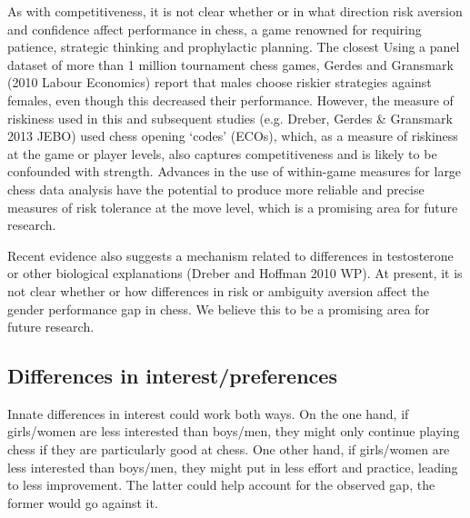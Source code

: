 As with competitiveness, it is not clear whether or in what direction risk aversion and confidence affect performance in chess, a game renowned for requiring patience, strategic thinking and prophylactic planning. The closest Using a panel dataset of more than 1 million tournament chess games, Gerdes and Gransmark (2010 Labour Economics) report that males choose riskier strategies against females, even though this decreased their performance. However, the measure of riskiness used in this and subsequent studies (e.g. Dreber, Gerdes & Gransmark 2013 JEBO) used chess opening `codes' (ECOs), which, as a measure of riskiness at the game or player levels, also captures competitiveness and is likely to be confounded with strength. Advances in the use of within-game measures for large chess data analysis have the potential to produce more reliable and precise measures of risk tolerance at the move level, which is a promising area for future research.

Recent evidence also suggests a mechanism related to differences in testosterone \cite{sapienza2009gender} or other biological explanations (Dreber and Hoffman 2010 WP).  At present, it is not clear whether or how differences in risk or ambiguity aversion affect the gender performance gap in chess. We believe this to be a promising area for future research.

\subsection*{Differences in interest/preferences}
Innate differences in interest could work both ways. On the one hand, if girls/women are less interested than boys/men, they might only continue playing chess if they are particularly good at chess. One other hand, if girls/women are less interested than boys/men, they might put in less effort and practice, leading to less improvement. The latter could help account for the observed gap, the former would go against it. 

